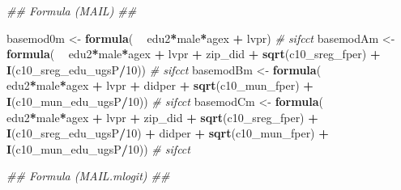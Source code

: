 \documentclass[
]{article}
\newenvironment{Shaded}{\begin{snugshade}}{\end{snugshade}}
\newcommand{\CommentTok}[1]{\textcolor[rgb]{0.56,0.35,0.01}{\textit{#1}}}
\newcommand{\DecValTok}[1]{\textcolor[rgb]{0.00,0.00,0.81}{#1}}
\newcommand{\KeywordTok}[1]{\textcolor[rgb]{0.13,0.29,0.53}{\textbf{#1}}}
\newcommand{\NormalTok}[1]{#1}
\newcommand{\OperatorTok}[1]{\textcolor[rgb]{0.81,0.36,0.00}{\textbf{#1}}}
\newcommand{\StringTok}[1]{\textcolor[rgb]{0.31,0.60,0.02}{#1}}
\begin{document}
\begin{Shaded}
\begin{Highlighting}[]
\CommentTok{## Formula (MAIL) ##}

\NormalTok{basemod0m <-}\StringTok{ }\KeywordTok{formula}\NormalTok{(  }\OperatorTok{~}\StringTok{ }\NormalTok{edu2}\OperatorTok{*}\NormalTok{male}\OperatorTok{*}\NormalTok{agex }\OperatorTok{+}\StringTok{ }\NormalTok{lvpr) }\CommentTok{# sifcct}
\NormalTok{basemodAm <-}\StringTok{ }\KeywordTok{formula}\NormalTok{(  }\OperatorTok{~}\StringTok{ }\NormalTok{edu2}\OperatorTok{*}\NormalTok{male}\OperatorTok{*}\NormalTok{agex }\OperatorTok{+}\StringTok{ }\NormalTok{lvpr }\OperatorTok{+}\StringTok{  }
\StringTok{                         }\NormalTok{zip_did }\OperatorTok{+}\StringTok{ }\KeywordTok{sqrt}\NormalTok{(c10_sreg_fper) }\OperatorTok{+}\StringTok{ }\KeywordTok{I}\NormalTok{(c10_sreg_edu_ugsP}\OperatorTok{/}\DecValTok{10}\NormalTok{)) }\CommentTok{# sifcct}
\NormalTok{basemodBm <-}\StringTok{ }\KeywordTok{formula}\NormalTok{(  }\OperatorTok{~}\StringTok{ }\NormalTok{edu2}\OperatorTok{*}\NormalTok{male}\OperatorTok{*}\NormalTok{agex }\OperatorTok{+}\StringTok{ }\NormalTok{lvpr }\OperatorTok{+}\StringTok{  }
\StringTok{                         }\NormalTok{didper }\OperatorTok{+}\StringTok{ }\KeywordTok{sqrt}\NormalTok{(c10_mun_fper) }\OperatorTok{+}\StringTok{ }\KeywordTok{I}\NormalTok{(c10_mun_edu_ugsP}\OperatorTok{/}\DecValTok{10}\NormalTok{)) }\CommentTok{# sifcct}
\NormalTok{basemodCm <-}\StringTok{ }\KeywordTok{formula}\NormalTok{(  }\OperatorTok{~}\StringTok{ }\NormalTok{edu2}\OperatorTok{*}\NormalTok{male}\OperatorTok{*}\NormalTok{agex }\OperatorTok{+}\StringTok{ }\NormalTok{lvpr }\OperatorTok{+}\StringTok{  }
\StringTok{                         }\NormalTok{zip_did }\OperatorTok{+}\StringTok{ }\KeywordTok{sqrt}\NormalTok{(c10_sreg_fper) }\OperatorTok{+}\StringTok{ }\KeywordTok{I}\NormalTok{(c10_sreg_edu_ugsP}\OperatorTok{/}\DecValTok{10}\NormalTok{) }\OperatorTok{+}\StringTok{ }
\StringTok{                         }\NormalTok{didper }\OperatorTok{+}\StringTok{ }\KeywordTok{sqrt}\NormalTok{(c10_mun_fper) }\OperatorTok{+}\StringTok{ }\KeywordTok{I}\NormalTok{(c10_mun_edu_ugsP}\OperatorTok{/}\DecValTok{10}\NormalTok{)) }\CommentTok{# sifcct}

\CommentTok{## Formula (MAIL.mlogit) ##}


\end{Highlighting}
\end{Shaded}
\end{document}

